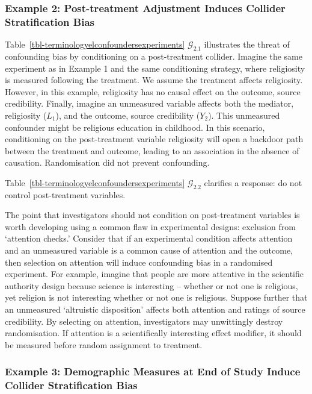 \documentclass[
  single column]{article}
\begin{document}
\subsubsection{Example 2: Post-treatment Adjustment Induces Collider
Stratification
Bias}\label{example-2-post-treatment-adjustment-induces-collider-stratification-bias}

Table~\ref{tbl-terminologyelconfoundersexperiments}
\(\mathcal{G}_{2.1}\) illustrates the threat of confounding bias by
conditioning on a post-treatment collider. Imagine the same experiment
as in Example 1 and the same conditioning strategy, where religiosity is
measured following the treatment. We assume the treatment affects
religiosity. However, in this example, religiosity has no causal effect
on the outcome, source credibility. Finally, imagine an unmeasured
variable affects both the mediator, religiosity (\(L_1\)), and the
outcome, source credibility (\(Y_2\)). This unmeasured confounder might
be religious education in childhood. In this scenario, conditioning on
the post-treatment variable religiosity will open a backdoor path
between the treatment and outcome, leading to an association in the
absence of causation. Randomisation did not prevent confounding.

Table~\ref{tbl-terminologyelconfoundersexperiments}
\(\mathcal{G}_{2.2}\) clarifies a response: do not control
post-treatment variables.

The point that investigators should not condition on post-treatment
variables is worth developing using a common flaw in experimental
designs: exclusion from `attention checks.' Consider that if an
experimental condition affects attention and an unmeasured variable is a
common cause of attention and the outcome, then selection on attention
will induce confounding bias in a randomised experiment. For example,
imagine that people are more attentive in the scientific authority
design because science is interesting -- whether or not one is
religious, yet religion is not interesting whether or not one is
religious. Suppose further that an unmeasured `altruistic disposition'
affects both attention and ratings of source credibility. By selecting
on attention, investigators may unwittingly destroy randomisation. If
attention is a scientifically interesting effect modifier, it should be
measured before random assignment to treatment.

\subsubsection{Example 3: Demographic Measures at End of Study Induce
Collider Stratification
Bias}\label{example-3-demographic-measures-at-end-of-study-induce-collider-stratification-bias}
\end{document}
